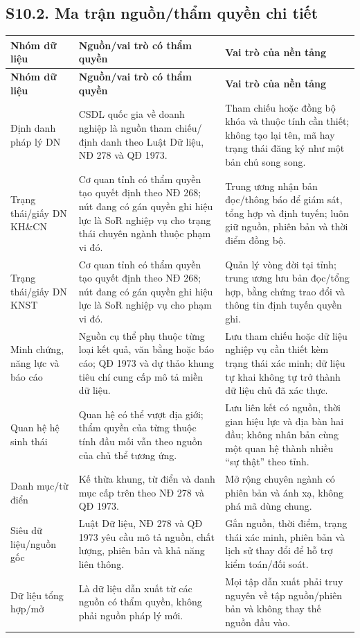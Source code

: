 \documentclass[a4paper,11pt]{article}
\begin{document}
\subsection*{S10.2. Ma trận nguồn/thẩm quyền chi tiết}
\small
\setlength{\tabcolsep}{2.4pt}
\renewcommand{\arraystretch}{1.02}
\begin{longtable}{@{}p{3.0cm}p{5.2cm}p{6.2cm}@{}}
\toprule
\textbf{Nhóm dữ liệu} & \textbf{Nguồn/vai trò có thẩm quyền} & \textbf{Vai trò của nền tảng} \\
\midrule
\endfirsthead
\toprule
\textbf{Nhóm dữ liệu} & \textbf{Nguồn/vai trò có thẩm quyền} & \textbf{Vai trò của nền tảng} \\
\midrule
\endhead
\bottomrule
\endfoot
Định danh pháp lý DN & CSDL quốc gia về doanh nghiệp là nguồn tham chiếu/định danh theo Luật Dữ liệu, NĐ 278 và QĐ 1973. & Tham chiếu hoặc đồng bộ khóa và thuộc tính cần thiết; không tạo lại tên, mã hay trạng thái đăng ký như một bản chủ song song. \\
\addlinespace
Trạng thái/giấy DN KH\&CN & Cơ quan tỉnh có thẩm quyền tạo quyết định theo NĐ 268; nút đang có gán quyền ghi hiệu lực là SoR nghiệp vụ cho trạng thái chuyên ngành thuộc phạm vi đó. & Trung ương nhận bản đọc/thông báo để giám sát, tổng hợp và định tuyến; luôn giữ nguồn, phiên bản và thời điểm đồng bộ. \\
\addlinespace
Trạng thái/giấy DN KNST & Cơ quan tỉnh có thẩm quyền tạo quyết định theo NĐ 268; nút đang có gán quyền ghi hiệu lực là SoR nghiệp vụ cho phạm vi đó. & Quản lý vòng đời tại tỉnh; trung ương lưu bản đọc/tổng hợp, bằng chứng trao đổi và thông tin định tuyến quyền ghi. \\
\addlinespace
Minh chứng, năng lực và báo cáo & Nguồn cụ thể phụ thuộc từng loại kết quả, văn bằng hoặc báo cáo; QĐ 1973 và dự thảo khung tiêu chí cung cấp mô tả miền dữ liệu. & Lưu tham chiếu hoặc dữ liệu nghiệp vụ cần thiết kèm trạng thái xác minh; dữ liệu tự khai không tự trở thành dữ liệu chủ đã xác thực. \\
\addlinespace
Quan hệ hệ sinh thái & Quan hệ có thể vượt địa giới; thẩm quyền của từng thuộc tính đầu mối vẫn theo nguồn của chủ thể tương ứng. & Lưu liên kết có nguồn, thời gian hiệu lực và địa bàn hai đầu; không nhân bản cùng một quan hệ thành nhiều ``sự thật'' theo tỉnh. \\
\addlinespace
Danh mục/từ điển & Kế thừa khung, từ điển và danh mục cấp trên theo NĐ 278 và QĐ 1973. & Mở rộng chuyên ngành có phiên bản và ánh xạ, không phá mã dùng chung. \\
\addlinespace
Siêu dữ liệu/nguồn gốc & Luật Dữ liệu, NĐ 278 và QĐ 1973 yêu cầu mô tả nguồn, chất lượng, phiên bản và khả năng liên thông. & Gắn nguồn, thời điểm, trạng thái xác minh, phiên bản và lịch sử thay đổi để hỗ trợ kiểm toán/đối soát. \\
\addlinespace
Dữ liệu tổng hợp/mở & Là dữ liệu dẫn xuất từ các nguồn có thẩm quyền, không phải nguồn pháp lý mới. & Mọi tập dẫn xuất phải truy nguyên về tập nguồn/phiên bản và không thay thế nguồn đầu vào. \\
\end{longtable}
\normalsize
\end{document}
